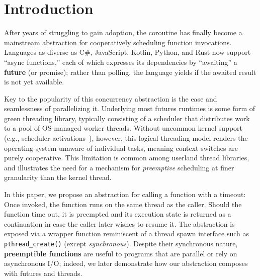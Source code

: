 \section{Introduction}
\label{sec:intro}

After years of struggling to gain adoption, the coroutine has finally become a
mainstream abstraction for cooperatively scheduling function invocations.  Languages
as diverse as C\#, JavaScript, Kotlin, Python, and Rust now support ``async
functions,'' each of which expresses its dependencies by ``awaiting'' a
\textbf{future} (or promise); rather than polling, the language yields if the awaited
result is not yet available.

Key to the popularity of this concurrency abstraction is the ease and seamlessness of
parallelizing it.  Underlying most futures runtimes is some form of green threading
library, typically consisting of a scheduler that distributes work to a pool of
OS-managed worker threads.  Without uncommon kernel
support (e.g., scheduler activations~\cite{anderson:sosp1991}), however, this logical
threading model renders the operating system unaware of individual tasks, meaning
context switches are purely cooperative.  This limitation is common among userland
thread libraries, and illustrates the need for a mechanism for \textit{preemptive}
scheduling at finer granularity than the kernel thread.

In this paper, we propose an abstraction for calling a function with a timeout:  Once
invoked, the function runs on the same thread as the caller.  Should the function
time out, it is preempted and its execution state is returned as a continuation in
case the caller later wishes to resume it.  The abstraction is exposed via a wrapper
function reminiscent of a thread spawn interface such as \texttt{pthread\_create()}
(except \textit{synchronous}).  Despite their synchronous nature, \textbf{preemptible
functions} are useful to programs that are parallel or rely on asynchronous I/O;
indeed, we later demonstrate how our abstraction composes with futures and threads.

